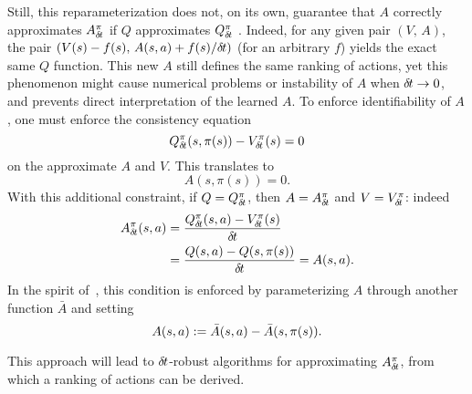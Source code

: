 Still, this reparameterization does not, on its own, guarantee that $A$
correctly approximates $A^\pi_{\delta\hspace{-.1em}t}$ if
$Q$ approximates $Q^\pi_{\delta\hspace{-.1em}t}$%
.
Indeed, for any given pair $(V,\,A)$, the pair $(V(s) -
f(s),\,A(s,a)+f(s)/{\delta\hspace{-.1em}t})$ (for an arbitrary $f$)
yields the exact same $Q$ function. This new $A$ still defines %
the same ranking of actions, yet this phenomenon might cause
numerical problems or instability of $A$ when ${\delta\hspace{-.1em}t}\to 0$, and prevents direct
interpretation of the learned $A$.
To enforce identifiability of $A$, one must enforce the consistency equation
\begin{equation}
	Q^\pi_{\delta\hspace{-.1em}t}(s, \pi(s)) - V^\pi_{\delta\hspace{-.1em}t}(s) = 0
\end{equation}
on the approximate $A$ and $V$. This translates to
\begin{equation}
	A(s, \pi(s)) = 0.
\end{equation}
With this additional constraint, if $Q = Q^\pi_{\delta\hspace{-.1em}t}$, then $A =
A^\pi_{\delta\hspace{-.1em}t}$ and $V = V^\pi_{\delta\hspace{-.1em}t}$: indeed 
\begin{align}
	A^\pi_{\delta\hspace{-.1em}t}(s, a) &= \frac{Q^\pi_{\delta\hspace{-.1em}t}(s,a) - V^\pi_{\delta\hspace{-.1em}t}(s)}{{\delta\hspace{-.1em}t}}\\
		    &= \frac{Q(s,a) - Q(s, \pi(s))}{{\delta\hspace{-.1em}t}}
		    = A(s, a).
\end{align}
In the spirit of~\cite{dueling_nets}, this condition is enforced by
parameterizing $A$ through another function $\bar{A}$ and setting
\begin{equation}
\label{eq:Aparam}
	A(s, a) \mathrel{\mathop{:}}= \bar{A}(s, a) - \bar{A}(s, \pi(s)).
\end{equation}

This approach will lead to ${\delta\hspace{-.1em}t}$-robust algorithms for
approximating $A^\pi_{\delta\hspace{-.1em}t}$, from which a ranking of actions can be
derived.

